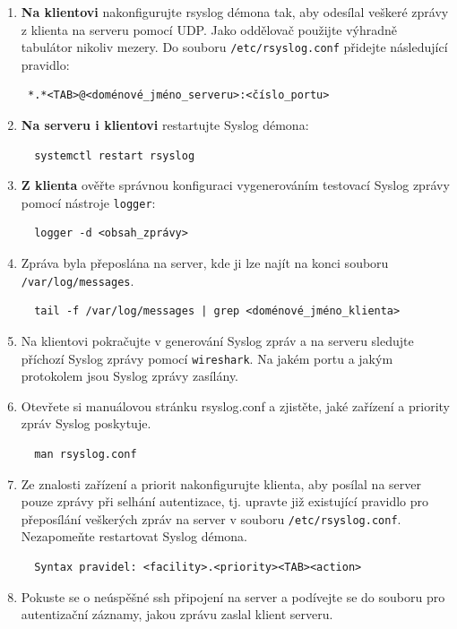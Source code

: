 \begin{itemize}
\begin{enumerate}
            \item {\bf Na klientovi} nakonfigurujte rsyslog démona tak, aby odesílal veškeré zprávy
         z klienta na serveru pomocí UDP. Jako oddělovač použijte výhradně tabulátor nikoliv mezery.
         Do souboru {\tt /etc/rsyslog.conf} přidejte následující pravidlo:
\begin{verbatim} 
 *.*<TAB>@<doménové_jméno_serveru>:<číslo_portu>
\end{verbatim}

            \item {\bf Na serveru i klientovi} restartujte Syslog démona: 
\begin{verbatim}
  systemctl restart rsyslog
\end{verbatim} 

            \item {\bf Z klienta} ověřte správnou konfiguraci vygenerováním testovací Syslog 
         zprávy pomocí nástroje {\tt logger}:
\begin{verbatim} 
  logger -d <obsah_zprávy>
\end{verbatim} 
        
            \item Zpráva byla přeposlána na server, kde ji lze najít na konci souboru
         {\tt /var/log/messages}.

\begin{verbatim} 
  tail -f /var/log/messages | grep <doménové_jméno_klienta>
\end{verbatim} 

            \item  Na klientovi pokračujte v generování Syslog zpráv a 
         na serveru sledujte příchozí Syslog zprávy pomocí {\tt wireshark}. Na jakém
         portu a jakým protokolem jsou Syslog zprávy zasílány.
         
         

            \item Otevřete si manuálovou stránku rsyslog.conf a zjistěte, jaké zařízení a priority
         zpráv Syslog poskytuje. 
\begin{verbatim} 
  man rsyslog.conf
\end{verbatim} 
        
         \item Ze znalosti zařízení a priorit nakonfigurujte klienta, aby posílal na server 
         pouze zprávy při selhání autentizace, tj. upravte již existující pravidlo pro přeposílání
         veškerých zpráv na server v souboru {\tt /etc/rsyslog.conf}. Nezapomeňte restartovat Syslog démona. 
         
\begin{verbatim} 
  Syntax pravidel: <facility>.<priority><TAB><action>
\end{verbatim} 
         \item Pokuste se o neúspěšné ssh připojení na server a podívejte se do souboru pro autentizační záznamy, jakou zprávu zaslal klient serveru.


       \end{enumerate}
   \end{itemize}

